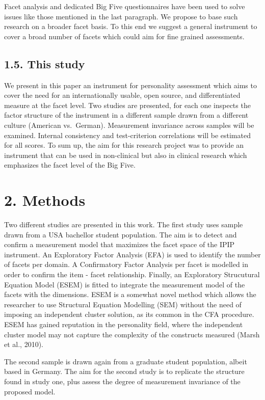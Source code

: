 \documentclass[floatsintext,man]{apa6}
\theoremstyle{definition}
\theoremstyle{definition}
\theoremstyle{definition}
\theoremstyle{remark}
\begin{document}
Facet analysis and dedicated Big Five questionnaires have been used to
solve issues like those mentioned in the last paragraph. We propose to
base such research on a broader facet basis. To this end we suggest a
general instrument to cover a broad number of facets which could aim for
fine grained assessments.

\hypertarget{this-study}{%
\subsection{1.5. This study}\label{this-study}}

We present in this paper an instrument for personality assessment which
aims to cover the need for an internationally usable, open source, and
differentiated measure at the facet level. Two studies are presented,
for each one inspects the factor structure of the instrument in a
different sample drawn from a different culture (American vs.~German).
Measurement invariance across samples will be examined. Internal
consistency and test-criterion correlations will be estimated for all
scores. To sum up, the aim for this research project was to provide an
instrument that can be used in non-clinical but also in clinical
research which emphasizes the facet level of the Big Five.

\hypertarget{methods}{%
\section{2. Methods}\label{methods}}

Two different studies are presented in this work. The first study uses
sample drawn from a USA bachellor student population. The aim is to
detect and confirm a measurement model that maximizes the facet space of
the IPIP instrument. An Exploratory Factor Analysis (EFA) is used to
identify the number of facets per domain. A Confirmatory Factor Analysis
per facet is modelled in order to confirm the item - facet relationship.
Finally, an Exploratory Strucutural Equation Model (ESEM) is fitted to
integrate the measurement model of the facets with the dimensions. ESEM
is a somewhat novel method which allows the researcher to use Structural
Equation Modelling (SEM) without the need of imposing an independent
cluster solution, as its common in the CFA procedure. ESEM has gained
reputation in the personality field, where the independent cluster model
may not capture the complexity of the constructs measured (Marsh et al.,
2010).

The second sample is drawn again from a graduate student population,
albeit based in Germany. The aim for the second study is to replicate
the structure found in study one, plus assess the degree of measurement
invariance of the proposed model.
\end{document}
